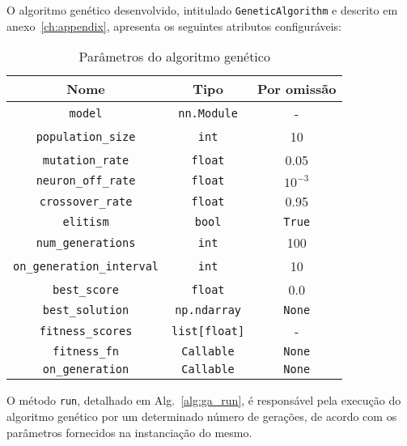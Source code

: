 O algoritmo genético desenvolvido, intitulado \texttt{GeneticAlgorithm} e descrito em anexo~\ref{ch:appendix}, apresenta os seguintes atributos configuráveis:

\begin{table}[htbp]
    \centering
    \begin{tabular}{ccc}
        \hline
        \textbf{Nome}                     & \textbf{Tipo}        & \textbf{Por omissão} \\ \hline
        \texttt{model}                    & \texttt{nn.Module}   & -                    \\
        \texttt{population\_size}         & \texttt{int}         & 10                   \\
        \texttt{mutation\_rate}           & \texttt{float}       & 0.05                 \\
        \texttt{neuron\_off\_rate}        & \texttt{float}       & $10^{-3}$            \\
        \texttt{crossover\_rate}          & \texttt{float}       & 0.95                 \\
        \texttt{elitism}                  & \texttt{bool}        & \texttt{True}        \\
        \texttt{num\_generations}         & \texttt{int}         & 100                  \\
        \texttt{on\_generation\_interval} & \texttt{int}         & 10                   \\
        \texttt{best\_score}              & \texttt{float}       & 0.0                  \\
        \texttt{best\_solution}           & \texttt{np.ndarray}  & \texttt{None}        \\
        \texttt{fitness\_scores}          & \texttt{list[float]} & -                    \\
        \texttt{fitness\_fn}              & \texttt{Callable}    & \texttt{None}        \\
        \texttt{on\_generation}           & \texttt{Callable}    & \texttt{None}        \\ \hline
    \end{tabular}
    \caption{Parâmetros do algoritmo genético}
    \label{tab:ga_params}
\end{table}

O método \texttt{run}, detalhado em Alg.~\ref{alg:ga_run}, é responsável pela execução do algoritmo genético por um determinado número de gerações, de acordo com os parâmetros fornecidos na instanciação do mesmo.

